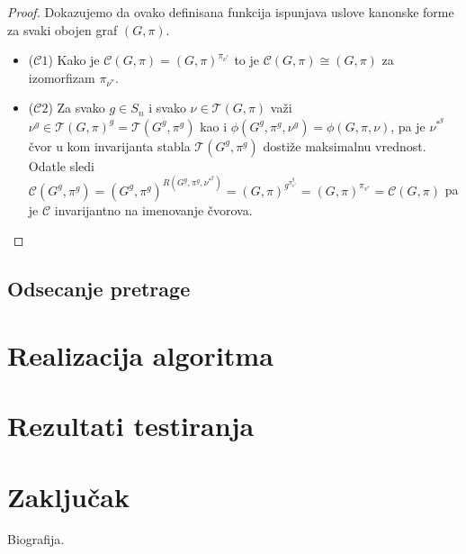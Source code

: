 \documentclass[12pt,oneside]{memoir}
\theoremstyle{definition}
\begin{document}
  \begin{proof}
		Dokazujemo da ovako definisana funkcija ispunjava uslove kanonske forme za
		svaki obojen graf $(G, \pi)$.
	  \begin{itemize}
			\item [] ($\mathcal{C}1$) Kako je $\mathcal{C}(G, \pi) = (G,
					\pi)^{\pi_{\nu^*}}$ to je $\mathcal{C}(G, \pi) \cong (G, \pi)$ za
			izomorfizam $\pi_{\nu^*}$.
			\item [] ($\mathcal{C}2$) Za svako $g \in S_n$ i svako $\nu \in
			\mathcal{T}(G, \pi)$ važi $\nu^g \in \mathcal{T}(G, \pi)^g =
			\mathcal{T}(G^g, \pi^g)$ kao i $\phi(G^g, \pi^g, \nu^g) = \phi(G, \pi,
					\nu)$, pa je $\nu^*^g$ čvor u kom invarijanta stabla
			$\mathcal{T}(G^g, \pi^g)$ dostiže maksimalnu vrednost. Odatle sledi
			$\mathcal{C}(G^g, \pi^g) = (G^g, \pi^g)^{R(G^g, \pi^g, \nu^*^g)} = (G,
					\pi)^g^{\pi_{v^*}^g} = (G, \pi)^{\pi_{v^*}} = \mathcal{C}(G, \pi)$ pa
			je $\mathcal{C}$ invarijantno na imenovanje čvorova.
	  \end{itemize}
  \end{proof}

 \section{Odsecanje pretrage}

\chapter{Realizacija algoritma}

\chapter{Rezultati testiranja}

\chapter{Zaključak}

\literatura

\backmatter

\begin{biografija}
	Biografija.
\end{biografija}
\end{document}

